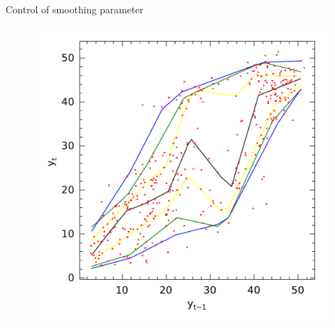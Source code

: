 \begin{frame}{Control of smoothing parameter}
\begin{figure}
\begin{minipage}[t]{\linewidth}
\begin{minipage}[t]{0.45\linewidth}
      \centering     \includegraphics[width=\textwidth]{../Figuras/npqar/icaraizinho-crossing-3}
    \end{minipage}
  \end{minipage}
\end{figure}

\end{frame}


